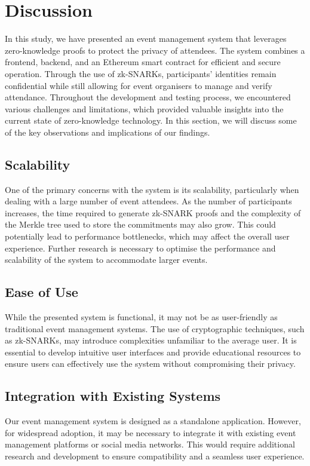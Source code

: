 \chapter{Discussion}
In this study, we have presented an event management system that leverages zero-knowledge proofs to protect the privacy of attendees. The system combines a frontend, backend, and an Ethereum smart contract for efficient and secure operation. Through the use of zk-SNARKs, participants' identities remain confidential while still allowing for event organisers to manage and verify attendance.
Throughout the development and testing process, we encountered various challenges and limitations, which provided valuable insights into the current state of zero-knowledge technology. In this section, we will discuss some of the key observations and implications of our findings.

\section{Scalability}
One of the primary concerns with the system is its scalability, particularly when dealing with a large number of event attendees. As the number of participants increases, the time required to generate zk-SNARK proofs and the complexity of the Merkle tree used to store the commitments may also grow. This could potentially lead to performance bottlenecks, which may affect the overall user experience. Further research is necessary to optimise the performance and scalability of the system to accommodate larger events.

\section{Ease of Use}
While the presented system is functional, it may not be as user-friendly as traditional event management systems. The use of cryptographic techniques, such as zk-SNARKs, may introduce complexities unfamiliar to the average user. It is essential to develop intuitive user interfaces and provide educational resources to ensure users can effectively use the system without compromising their privacy.

\section{Integration with Existing Systems}
Our event management system is designed as a standalone application. However, for widespread adoption, it may be necessary to integrate it with existing event management platforms or social media networks. This would require additional research and development to ensure compatibility and a seamless user experience.

